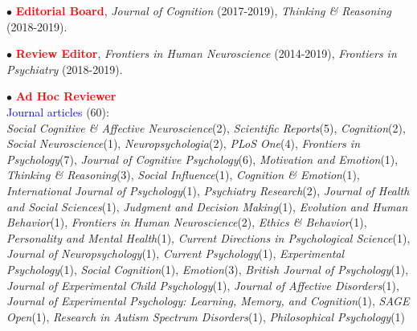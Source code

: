 \documentclass[10pt]{article}
\begin{document}
	
	$\bullet$ \textcolor{red}{{\textbf{Editorial Board}}}, \textit{Journal of Cognition} (2017-2019), \textit{Thinking \& Reasoning} (2018-2019).
	\miniskip
	
	$\bullet$ \textcolor{red}{{\textbf{Review Editor}}}, \textit{Frontiers in Human Neuroscience} (2014-2019), \textit{Frontiers in Psychiatry} (2018-2019).
	\miniskip
	
	$\bullet$ \textcolor{red}{{\textbf{Ad Hoc Reviewer}}}\\
	\textcolor{blue}{{\hspace*{0.1in}Journal articles}} (60):\\
	\hspace*{0.1in}\textit{Social Cognitive \& Affective Neuroscience}(2), \textit{Scientific Reports}(5), \textit{Cognition}(2), \textit{Social Neuroscience}(1), 
	\hspace*{0.1in}\textit{Neuropsychologia}(2), \textit{PLoS One}(4), \textit{Frontiers in Psychology}(7), \textit{Journal of Cognitive Psychology}(6), 
	\hspace*{0.1in}\textit{Motivation and Emotion}(1), \textit{Thinking \& Reasoning}(3), \textit{Social Influence}(1), \textit{Cognition \& Emotion}(1),
	\hspace*{0.1in}\textit{International Journal of Psychology}(1),  \textit{Psychiatry Research}(2),
	\textit{Journal of Health and Social Sciences}(1),
	\hspace*{0.1in}\textit{Judgment and Decision Making}(1), \textit{Evolution and Human Behavior}(1),   \textit{Frontiers in Human Neuroscience}(2), 
	\hspace*{0.1in}\textit{Ethics \& Behavior}(1), \textit{Personality and Mental Health}(1),  \textit{Current Directions in Psychological Science}(1),
	\hspace*{0.1in}\textit{Journal of Neuropsychology}(1), \textit{Current Psychology}(1), \textit{Experimental Psychology}(1), \textit{Social Cognition}(1), 
	\hspace*{0.1in}\textit{Emotion}(3), \textit{British Journal of Psychology}(1), \textit{Journal of Experimental Child Psychology}(1), \textit{Journal of \hspace*{0.1in}Affective Disorders}(1), \textit{Journal of Experimental Psychology: Learning, Memory, and Cognition}(1), \textit{SAGE \hspace*{0.1in}Open}(1), \textit{Research in Autism Spectrum Disorders}(1), \textit{Philosophical Psychology}(1)  
	
\end{document}
